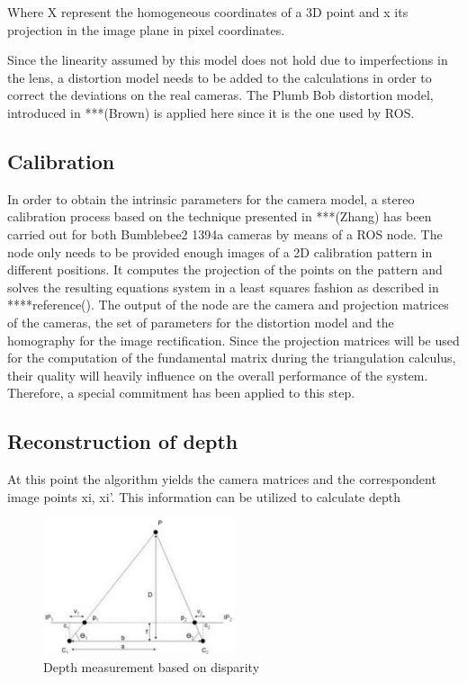 Where X represent the homogeneous coordinates of a 3D point and x its projection in the image plane in pixel coordinates.

Since the linearity assumed by this model does not hold due to imperfections in the lens, a distortion model needs to be added to the calculations in order to correct the deviations on the real cameras. The Plumb Bob distortion model, introduced in ***(Brown) is applied here since it is the one used by ROS.

\subsection{Calibration}
In order to obtain the intrinsic parameters for the camera model, a stereo calibration process based on the technique presented in ***(Zhang) has been carried out for both Bumblebee2 1394a cameras by means of a ROS node. 
The node only needs to be provided enough images of a 2D calibration pattern in different positions. It computes the projection of the points on the pattern and solves the resulting equations system in a least squares fashion as described in ****reference(). The output of the node are the camera and projection matrices of the cameras, the set of parameters for the distortion model and the homography for the image rectification. Since the projection matrices will be used for the computation of the fundamental matrix during the triangulation calculus, their quality will heavily influence on the overall performance of the system. Therefore, a special commitment has been applied to this step. 


\subsection{Reconstruction of depth}
At this point the algorithm yields the camera matrices and the correspondent image points {xi, xi'}. This information can be utilized to calculate depth 


\begin{figure}[h]
    \centering
    \includegraphics[width=0.5\textwidth]{images/triangulate}
    \caption{Depth measurement based on disparity}
    \label{fig:Depth_disparity}
\end{figure}



